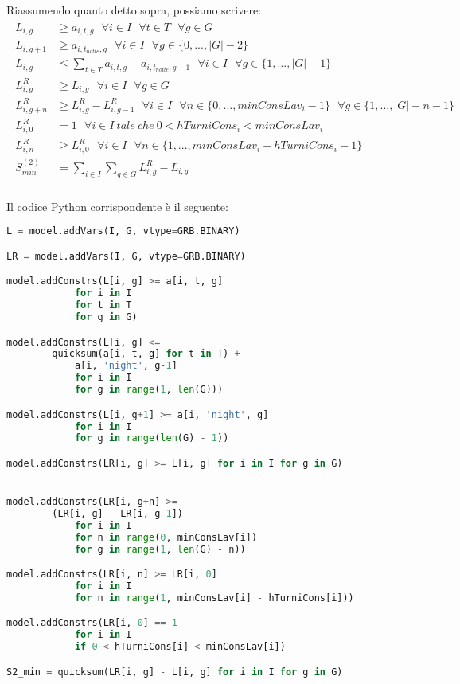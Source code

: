 Riassumendo quanto detto sopra, possiamo scrivere:
\begin{gather}
\begin{aligned}
L_{i, g} &\geq a_{i, t, g} ~~~ \forall i \in I ~~~ \forall t \in T ~~~ \forall g \in G \\
L_{i, g+1} &\geq a_{i, t_{notte}, g} ~~~ \forall i \in I ~~~ \forall g \in \{0,...,|G| - 2\} \\
L_{i, g} &\leq \sum_{t \in T} a_{i, t, g} + a_{i, t_{notte}, g-1} ~~~ \forall i \in I ~~~ \forall g \in \{1,...,|G| - 1\} \\
L_{i, g}^R &\geq L_{i, g} ~~~ \forall i \in I ~~~ \forall g \in G \\
L_{i, g+n}^R &\geq L_{i, g}^R - L_{i, g-1}^R ~~~ \forall i \in I ~~~ \forall n \in \{0,...,minConsLav_i - 1\} ~~~ \forall g \in \{1,...,|G| - n - 1\} \\
L_{i, 0}^R &= 1 ~~~ \forall i \in I ~ tale ~ che ~ 0 < hTurniCons_i < minConsLav_i \\
L_{i, n}^R &\geq L_{i, 0}^R ~~~ \forall i \in I ~~~ \forall n \in \{1,...,minConsLav_i - hTurniCons_i - 1\} \\
S^{(2)}_{min} &= \sum_{i \in I} \sum_{g \in G} L_{i, g}^R - L_{i, g} \\
\end{aligned}
\end{gather}
 
Il codice Python corrispondente è il seguente:
\begin{lstlisting}[language=Python]
L = model.addVars(I, G, vtype=GRB.BINARY)

LR = model.addVars(I, G, vtype=GRB.BINARY)

model.addConstrs(L[i, g] >= a[i, t, g]
            for i in I
            for t in T
            for g in G)

model.addConstrs(L[i, g] <= 
		quicksum(a[i, t, g] for t in T) + 
			a[i, 'night', g-1]
            for i in I
            for g in range(1, len(G)))

model.addConstrs(L[i, g+1] >= a[i, 'night', g]
            for i in I
            for g in range(len(G) - 1))

model.addConstrs(LR[i, g] >= L[i, g] for i in I for g in G)


model.addConstrs(LR[i, g+n] >= 
		(LR[i, g] - LR[i, g-1])
            for i in I
            for n in range(0, minConsLav[i])
            for g in range(1, len(G) - n))

model.addConstrs(LR[i, n] >= LR[i, 0]
            for i in I
            for n in range(1, minConsLav[i] - hTurniCons[i]))

model.addConstrs(LR[i, 0] == 1
            for i in I
            if 0 < hTurniCons[i] < minConsLav[i])

S2_min = quicksum(LR[i, g] - L[i, g] for i in I for g in G)

\end{lstlisting}

